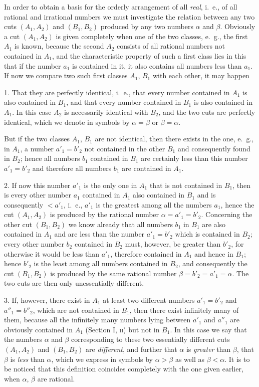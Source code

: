 \documentclass[twoside,openright]{article}
\begin{document}
In order to obtain a basis for the orderly arrangement of all
\textit{real}, i.~e., of all rational and irrational numbers we must
investigate the relation between any two cuts $(A_1, A_2)$ and
$(B_1, B_2)$ produced by any two numbers $\alpha$ and
$\beta$. Obviously a cut $(A_1, A_2)$ is given completely when one of
the two classes, e.~g., the first $A_1$ is known, because the second
$A_2$ consists of all rational numbers not contained in $A_1$, and the
characteristic property of such a first class lies in this that if the
number $a_1$ is contained in it, it also contains all numbers less
than $a_1$. If now we compare two such first classes $A_1$, $B_1$ with
each other, it may happen

1. That they are perfectly identical, i.~e., that every number
contained in $A_1$ is also contained in $B_1$, and that every number
contained in $B_1$ is also contained in $A_1$. In this case $A_2$ is
necessarily identical with $B_2$, and the two cuts are perfectly
identical, which we denote in symbols by $\alpha=\beta$ or
$\beta=\alpha$.

But if the two classes $A_1$, $B_1$ are not identical, then there
exists in the one, e.~g., in $A_1$, a number $a'_1=b'_2$ not contained
in the other $B_1$ and consequently found in $B_2$; hence all numbers
$b_1$ contained in $B_1$ are certainly less than this number
$a'_1=b'_2$ and therefore all numbers $b_1$ are contained in $A_1$.

2. If now this number $a'_1$ is the only one in $A_1$ that is not
contained in $B_1$, then is every other number $a_1$ contained in
$A_1$ also contained in $B_1$ and is consequently $<a'_1$, i.~e.,
$a'_1$ is the greatest among all the numbers $a_1$, hence the cut
$(A_1, A_2)$ is produced by the rational number
$\alpha=a'_1=b'_2$. Concerning the other cut $(B_1, B_2)$ we know already
that all numbers $b_1$ in $B_1$ are also contained in $A_1$ and are
less than the number $a'_1=b'_2$ which is contained in $B_2$; every
other number $b_2$ contained in $B_2$ must, however, be greater than
$b'_2$, for otherwise it would be less than $a'_1$, therefore
contained in $A_1$ and hence in $B_1$; hence $b'_2$ is the least among
all numbers contained in $B_2$, and consequently the cut $(B_1, B_2)$
is produced by the same rational number
$\beta = b'_2 = a'_1 = \alpha$. The two cuts are then only
unessentially different.

3. If, however, there exist in $A_1$ at least two different numbers
$a'_1 = b'_2$ and $a''_1 = b''_2$, which are not contained in $B_1$,
then there exist infinitely many of them, because all the infinitely
many numbers lying between $a'_1$ and $a''_1$ are obviously contained
in $A_1$ (Section I, \textsc{ii}) but not in $B_1$. In this case we
say that the numbers $\alpha$ and $\beta$ corresponding to these two
essentially different cuts $(A_1, A_2)$ and $(B_1, B_2)$ are
\textit{different}, and further that $\alpha$ is \textit{greater} than
$\beta$, that $\beta$ is \textit{less} than $\alpha$, which we express
in symbols by $\alpha > \beta$ as well as $\beta < \alpha$.  It is to
be noticed that this definition coincides completely with the one
given earlier, when $\alpha$, $\beta$ are rational.
\end{document}
